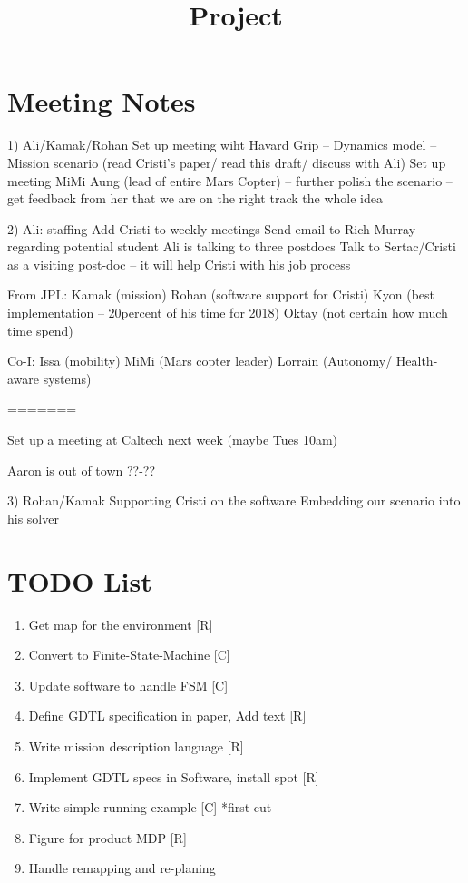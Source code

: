 \documentclass[conference]{IEEEtran}
\begin{document}
\title{Project}

\section{Meeting Notes} \label{sec:meetingNotes}

1) Ali/Kamak/Rohan
Set up meeting wiht Havard Grip
    -- Dynamics model
    -- Mission scenario (read Cristi's paper/ read this draft/ discuss with Ali)
Set up meeting MiMi Aung (lead of entire Mars Copter)
    -- further polish the scenario
    -- get feedback from her that we are on the right track the whole idea
    
2) Ali: staffing
Add Cristi to weekly meetings
Send email to Rich Murray regarding potential student
Ali is talking to three postdocs
Talk to Sertac/Cristi as a visiting post-doc
    -- it will help Cristi with his job process

From JPL:
Kamak (mission)
Rohan (software support for Cristi)
Kyon (best implementation -- 20percent of his time for 2018)
Oktay (not certain how much time spend)

Co-I:
Issa (mobility)
MiMi (Mars copter leader)
Lorrain (Autonomy/ Health-aware systems)

=======

Set up a meeting at Caltech next week (maybe Tues 10am)

Aaron is out of town ??-?? 

3) Rohan/Kamak
Supporting Cristi on the software
Embedding our scenario into his solver

\section{TODO List}
\begin{enumerate}
  \item Get map for the environment [R]
  \item Convert to Finite-State-Machine [C]
  \item Update software to handle FSM [C]
  \item Define GDTL specification in paper, Add text [R]
  \item Write mission description language [R]
  \item Implement GDTL specs in Software, install spot [R]
  \item Write simple running example [C] *first cut
  \item Figure for product MDP [R]
  \item Handle remapping and re-planing
\end{enumerate} \
\end{document}
